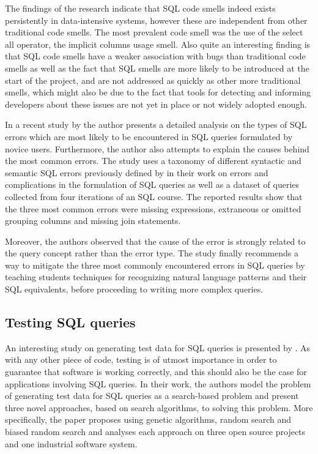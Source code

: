 The findings of the research indicate that SQL code smells indeed exists persistently in data-intensive systems, however these are independent from other traditional code smells. The most prevalent code smell was the use of the select all operator, the implicit columns usage smell. Also quite an interesting finding is that SQL code smells have a weaker association with bugs than traditional code smells as well as the fact that SQL smells are more likely to be introduced at the start of the project, and are not addressed as quickly as other more traditional smells, which might also be due to the fact that tools for detecting and informing developers about these issues are not yet in place or not widely adopted enough.

In a recent study by \citet{P015} the author presents a detailed analysis on the types of SQL errors which are most likely to be encountered in SQL queries formulated by novice users. Furthermore, the author also attempts to explain the causes behind the most common errors. The study uses a taxonomy of different syntactic and semantic SQL errors previously defined by \citet{P016} in their work on errors and complications in the formulation of SQL queries as well as a dataset of queries collected from four iterations of an SQL course. The reported results show that the three most common errors were missing expressions, extraneous or omitted grouping columns and missing join statements. 

Moreover, the authors observed that the cause of the error is strongly related to the query concept rather than the error type. The study finally recommends a way to mitigate the three most commonly encountered errors in SQL queries by teaching students techniques for recognizing natural language patterns and their SQL equivalents, before proceeding to writing more complex queries.

\subsection{Testing SQL queries}

An interesting study on generating test data for SQL queries is presented by \citet{P011}. As with any other piece of code, testing is of utmost importance in order to guarantee that software is working correctly, and this should also be the case for applications involving SQL queries. In their work, the authors model the problem of generating test data for SQL queries as a search-based problem and present three novel approaches, based on search algorithms, to solving this problem. More specifically, the paper proposes using genetic algorithms, random search and biased random search and analyses each approach on three open source projects and one industrial software system. 


